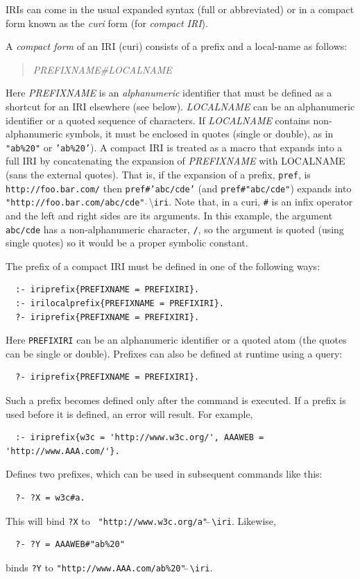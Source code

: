 \documentclass[11pt]{article}
\newcommand{\bs}{\textbackslash}
\begin{document}
IRIs can come in the usual expanded syntax (full or abbreviated)
or in a compact form
known as the \emph{curi} form (for \emph{compact IRI}).  

\index{\#}
A \emph{compact form} of an IRI (curi) consists of a
prefix and a local-name as follows:
\begin{quote}
 \emph{PREFIXNAME\#LOCALNAME} 
\end{quote}
Here
\emph{PREFIXNAME} is an \emph{alphanumeric} identifier that must be defined as a
shortcut for an IRI elsewhere (see below). \emph{LOCALNAME} can be
an alphanumeric identifier or a quoted sequence of characters. If \emph{LOCALNAME} contains
non-alphanumeric symbols, it must be enclosed in quotes (single or double),
as in {\tt "ab\%20"} or \texttt{'ab\%20'}).
A compact IRI is treated as a macro that expands into a full IRI
by concatenating the expansion of \emph{PREFIXNAME}
with LOCALNAME (sans the external quotes).
That is, if the expansion of a prefix, \texttt{pref}, is
\texttt{http://foo.bar.com/}
then \texttt{pref\#'abc/cde'} (and \texttt{pref\#"abc/cde"}) expands into
\texttt{"http://foo.bar.com/abc/cde"}$\hat{~}\hat{~}$\bs{}\texttt{iri}.
Note that, in a curi, \texttt{\#} is an infix operator and the left and
right sides are its arguments. In this example, the argument
\texttt{abc/cde}  has a non-alphanumeric character, \texttt{/}, so the
argument is
quoted (using single quotes) so it would be a proper symbolic constant.
    

The prefix of a compact IRI must be defined in one of the following ways:
\begin{verbatim}
  :- iriprefix{PREFIXNAME = PREFIXIRI}. 
  :- irilocalprefix{PREFIXNAME = PREFIXIRI}. 
  ?- iriprefix{PREFIXNAME = PREFIXIRI}. 
\end{verbatim}
Here {\tt PREFIXIRI}  can be an alphanumeric identifier or a
quoted atom (the quotes can be single or double). Prefixes can also be defined at runtime using a query:
\begin{verbatim}
  ?- iriprefix{PREFIXNAME = PREFIXIRI}. 
\end{verbatim}
Such a prefix becomes defined only after the command is executed.
If a prefix is used before it is defined, an error will result.
For example,
\begin{verbatim}
  :- iriprefix{w3c = 'http://www.w3c.org/', AAAWEB = 'http://www.AAA.com/'}. 
\end{verbatim}
Defines two prefixes, which can be used in subsequent commands like this:
\begin{verbatim}
  ?- ?X = w3c#a.
\end{verbatim}
This will bind {\tt ?X} to   {\tt
  "http://www.w3c.org/a"$\hat{~}\hat{~}$\bs{}iri}. 
Likewise,
\begin{verbatim}
  ?- ?Y = AAAWEB#"ab%20" 
\end{verbatim}
binds {\tt ?Y} to {\tt "http://www.AAA.com/ab\%20"$\hat{~}\hat{~}$\bs{}iri}. 
\end{document}
